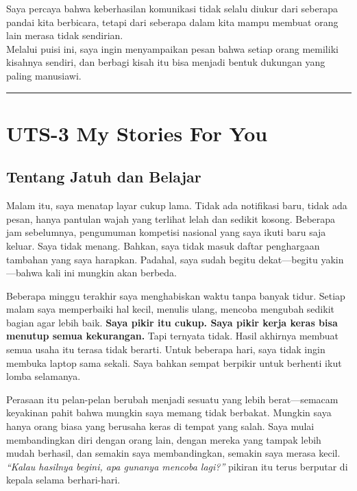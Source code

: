 \documentclass[
  letterpaper,
  DIV=11,
  numbers=noendperiod]{scrreprt}
\begin{document}
Saya percaya bahwa keberhasilan komunikasi tidak selalu diukur dari
seberapa pandai kita berbicara, tetapi dari seberapa dalam kita mampu
membuat orang lain merasa tidak sendirian.\\
Melalui puisi ini, saya ingin menyampaikan pesan bahwa setiap orang
memiliki kisahnya sendiri, dan berbagi kisah itu bisa menjadi bentuk
dukungan yang paling manusiawi.

\begin{center}\rule{0.5\linewidth}{0.5pt}\end{center}


\chapter{UTS-3 My Stories For You}\label{uts-3-my-stories-for-you}

\section{\texorpdfstring{\textbf{Tentang Jatuh dan
Belajar}}{Tentang Jatuh dan Belajar}}\label{tentang-jatuh-dan-belajar}

Malam itu, saya menatap layar cukup lama. Tidak ada notifikasi baru,
tidak ada pesan, hanya pantulan wajah yang terlihat lelah dan sedikit
kosong. Beberapa jam sebelumnya, pengumuman kompetisi nasional yang saya
ikuti baru saja keluar. Saya tidak menang. Bahkan, saya tidak masuk
daftar penghargaan tambahan yang saya harapkan. Padahal, saya sudah
begitu dekat---begitu yakin---bahwa kali ini mungkin akan berbeda.

Beberapa minggu terakhir saya menghabiskan waktu tanpa banyak tidur.
Setiap malam saya memperbaiki hal kecil, menulis ulang, mencoba mengubah
sedikit bagian agar lebih baik. \textbf{Saya pikir itu cukup. Saya pikir
kerja keras bisa menutup semua kekurangan.} Tapi ternyata tidak. Hasil
akhirnya membuat semua usaha itu terasa tidak berarti. Untuk beberapa
hari, saya tidak ingin membuka laptop sama sekali. Saya bahkan sempat
berpikir untuk berhenti ikut lomba selamanya.

Perasaan itu pelan-pelan berubah menjadi sesuatu yang lebih
berat---semacam keyakinan pahit bahwa mungkin saya memang tidak
berbakat. Mungkin saya hanya orang biasa yang berusaha keras di tempat
yang salah. Saya mulai membandingkan diri dengan orang lain, dengan
mereka yang tampak lebih mudah berhasil, dan semakin saya membandingkan,
semakin saya merasa kecil. \emph{``Kalau hasilnya begini, apa gunanya
mencoba lagi?''} pikiran itu terus berputar di kepala selama
berhari-hari.
\end{document}
